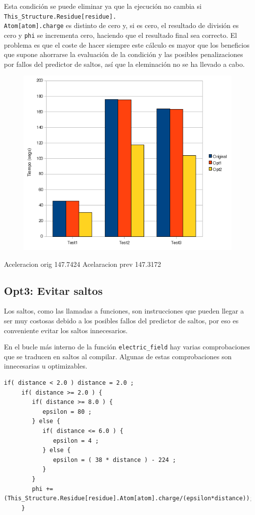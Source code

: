 Esta condici\'{o}n se puede eliminar ya que la ejecuci\'{o}n no cambia si
\texttt{This\_Structure.Residue[residue].\\Atom[atom].charge} es distinto de
cero y, si es cero, el resultado de divisi\'{o}n es cero y
\texttt{phi} se incrementa cero, haciendo que el resultado final sea correcto.
El problema es que el coste de hacer siempre este c\'{a}lculo es mayor que los
beneficios que supone ahorrarse la evaluaci\'{o}n de la condici\'{o}n y las
posibles penalizaciones
por fallos del predictor de saltos, as\'{i} que la eleminaci\'{o}n no se ha
llevado a cabo.

\begin{figure}[ht]
   \centering
   \includegraphics[keepaspectratio=true,width=.6\textwidth]{figures/opt2-perf}
\end{figure}


Aceleracion orig	147.7424%
Acelaracion prev	147.3172%

\subsection{Opt3: Evitar saltos}

Los saltos, como las llamadas a funciones, son instrucciones que pueden llegar
a ser muy costosas debido a  los posibles fallos del predictor de saltos, por
eso es conveniente evitar los saltos innecesarios.

En el bucle m\'{a}s interno de la funci\'{o}n \texttt{electric\_field} hay
varias comprobaciones que se traducen en saltos al compilar. Algunas de estas
comprobaciones son innecesarias u optimizables.

\begin{lstlisting}[]
     if( distance < 2.0 ) distance = 2.0 ;
     if( distance >= 2.0 ) {
        if( distance >= 8.0 ) {
           epsilon = 80 ;
        } else {
           if( distance <= 6.0 ) {
              epsilon = 4 ;
           } else {
              epsilon = ( 38 * distance ) - 224 ;
           }
        }
        phi += (This_Structure.Residue[residue].Atom[atom].charge/(epsilon*distance));
     }
\end{lstlisting}

